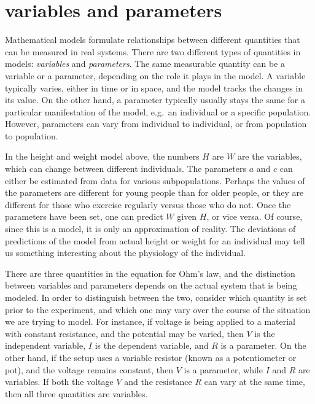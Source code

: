 \documentclass[
  letterpaper,
  DIV=11,
  numbers=noendperiod]{scrreprt}
\begin{document}
\hypertarget{variables-and-parameters}{%
\section*{variables and parameters}\label{variables-and-parameters}}

Mathematical models formulate relationships between different quantities
that can be measured in real systems. There are two different types of
quantities in models: \emph{variables} and \emph{parameters}. The same
measurable quantity can be a variable or a parameter, depending on the
role it plays in the model. A variable typically varies, either in time
or in space, and the model tracks the changes in its value. On the other
hand, a parameter typically usually stays the same for a particular
manifestation of the model, e.g.~an individual or a specific population.
However, parameters can vary from individual to individual, or from
population to population.

In the height and weight model above, the numbers \(H\) are \(W\) are
the variables, which can change between different individuals. The
parameters \(a\) and \(c\) can either be estimated from data for various
subpopulations. Perhaps the values of the parameters are different for
young people than for older people, or they are different for those who
exercise regularly versus those who do not. Once the parameters have
been set, one can predict \(W\) given \(H\), or vice versa. Of course,
since this is a model, it is only an approximation of reality. The
deviations of predictions of the model from actual height or weight for
an individual may tell us something interesting about the physiology of
the individual.

There are three quantities in the equation for Ohm's law, and the
distinction between variables and parameters depends on the actual
system that is being modeled. In order to distinguish between the two,
consider which quantity is set prior to the experiment, and which one
may vary over the course of the situation we are trying to model. For
instance, if voltage is being applied to a material with constant
resistance, and the potential may be varied, then \(V\) is the
independent variable, \(I\) is the dependent variable, and \(R\) is a
parameter. On the other hand, if the setup uses a variable resistor
(known as a potentiometer or pot), and the voltage remains constant,
then \(V\) is a parameter, while \(I\) and \(R\) are variables. If both
the voltage \(V\) and the resistance \(R\) can vary at the same time,
then all three quantities are variables.
\end{document}

